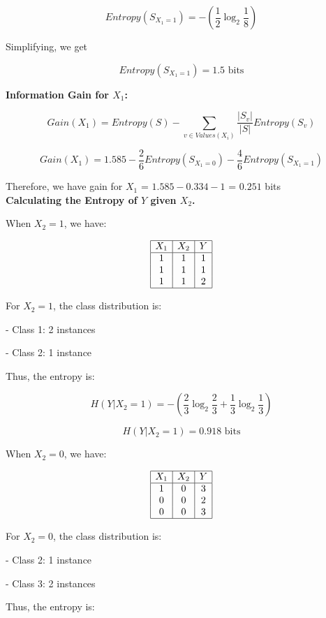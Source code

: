 \documentclass[12pt]{article}
\begin{document}
\[
  Entropy(S_{X_1=1}) = -\left( \frac{1}{2} \log_2 \frac{1}{8} \right)
\]

Simplifying, we get

\[
  Entropy(S_{X_1=1}) = 1.5 \text{ bits}
\]


\textbf{Information Gain for $X_1$:}

\[
  Gain(X_1) = Entropy(S) - \sum_{v \in Values(X_i)}^{} \frac{|S_v|}{|S|} Entropy(S_v)
\]

\[
  Gain(X_1) = 1.585 - \frac{2}{6} Entropy(S_{X_1=0}) - \frac{4}{6} Entropy(S_{X_1=1})
\]

Therefore, we have gain for $X_1$ = $1.585 - 0.334 - 1$ = $0.251$ bits \\[1em]

\textbf{Calculating the Entropy of $Y$ given $X_2$.}

When $X_2 = 1$, we have:

\[
  \begin{array}{|c|c|c|}
    \hline
    X_1 & X_2 & Y \\
    \hline
    1   & 1   & 1 \\
    1   & 1   & 1 \\
    1   & 1   & 2 \\
    \hline
  \end{array}
\]

For $X_2 = 1$, the class distribution is:

- Class 1: 2 instances

- Class 2: 1 instance

Thus, the entropy is:

\[
  H(Y|X_2 = 1) = -\left( \frac{2}{3} \log_2 \frac{2}{3} + \frac{1}{3} \log_2 \frac{1}{3} \right)
\]

\[
  H(Y|X_2 = 1) = 0.918 \text{ bits}
\]

When $X_2 = 0$, we have:

\[
  \begin{array}{|c|c|c|}
    \hline
    X_1 & X_2 & Y \\
    \hline
    1   & 0   & 3 \\
    0   & 0   & 2 \\
    0   & 0   & 3 \\
    \hline
  \end{array}
\]

For $X_2 = 0$, the class distribution is:

- Class 2: 1 instance

- Class 3: 2 instances

Thus, the entropy is:
\end{document}
